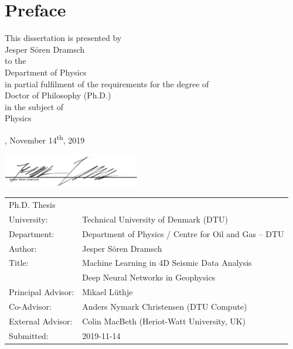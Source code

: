 \chapter{Preface}
\vspace*{1cm}
{\centering
\sffamily
This dissertation is presented by\\[3mm]
{\large Jesper S{\"o}ren Dramsch}\\[3mm]
to the\\[3mm]
{\large Department of Physics}\\[3mm]
in partial fulfilment of the requirements for the degree of\\[3mm]
{\large Doctor of Philosophy (Ph.D.)}\\[3mm]
in the subject of\\[3mm]
{\large Physics}

\vfill

    \thesislocation{}, November 14\textsuperscript{th}, 2019\\[1cm]
\begin{flushright}
    \includegraphics[width=0.45\textwidth]{graphics/Unterschrift.png}\\[1cm]
\end{flushright}
}
\clearpage
\newpage
\vspace*{3cm}
{\sffamily
\begin{tabular}{ll}
Ph.D. Thesis & \\[1mm]
University: & Technical University of Denmark (DTU)  \\[1mm]
Department: & Department of Physics / Centre for Oil and Gas -- DTU \\[1mm]
Author: & Jesper S{\"o}ren Dramsch \\[1mm]
Title: & Machine Learning in 4D Seismic Data Analysis\\[1mm]
       &Deep Neural Networks in Geophysics \\[1mm]
Principal Advisor: \hspace{1cm} & Mikael L{\"u}thje \\[1mm]
Co-Advisor: & Anders Nymark Christensen (DTU Compute) \\[1mm]
External Advisor: & Colin MacBeth (Heriot-Watt University, UK) \\[1mm]
Submitted: & 2019-11-14 
\end{tabular}
}